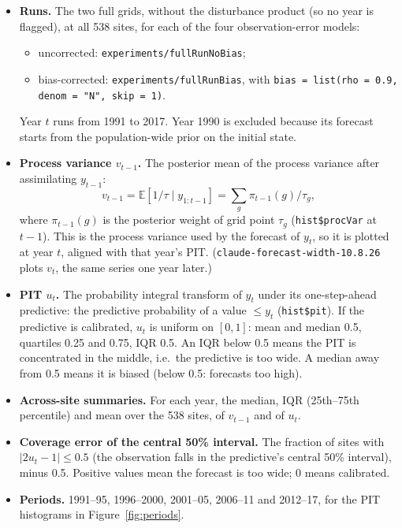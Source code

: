 \documentclass[11pt]{article}
\newcommand{\E}{\mathbb{E}}
\newcommand{\code}[1]{\texttt{#1}}
\begin{document}
\begin{itemize}
  \item \textbf{Runs.} The two full grids, without the disturbance product (so no year is
  flagged), at all 538 sites, for each of the four observation-error models:
  \begin{itemize}
    \item uncorrected: \code{experiments/fullRunNoBias};
    \item bias-corrected: \code{experiments/fullRunBias}, with
    \code{bias = list(rho = 0.9, denom = "N", skip = 1)}.
  \end{itemize}
  Year $t$ runs from 1991 to 2017. Year 1990 is excluded because its forecast starts
  from the population-wide prior on the initial state.
  \item \textbf{Process variance $v_{t-1}$.} The posterior mean of the process variance after assimilating
  $y_{t-1}$:
  \[
    v_{t-1} = \E[1/\tau \mid y_{1:t-1}] = \sum_g \pi_{t-1}(g)/\tau_g ,
  \]
  where $\pi_{t-1}(g)$ is the posterior weight of grid point $\tau_g$ (\code{hist\$procVar} at
  $t-1$). This is the process variance used by the forecast of $y_t$, so it is plotted at year
  $t$, aligned with that year's PIT. (\code{claude-forecast-width-10.8.26} plots $v_t$, the
  same series one year later.)
  \item \textbf{PIT $u_t$.} The probability integral transform of $y_t$ under its one-step-ahead
  predictive: the predictive probability of a value $\le y_t$ (\code{hist\$pit}). If
  the predictive is calibrated, $u_t$ is uniform on $[0,1]$: mean and median 0.5,
  quartiles 0.25 and 0.75, IQR 0.5. An IQR below 0.5 means the
  PIT is concentrated in the middle, i.e.\ the predictive is too wide. A median away from 0.5
  means it is biased (below 0.5: forecasts too high).
  \item \textbf{Across-site summaries.} For each year, the median, IQR (25th--75th
  percentile) and mean over the 538 sites, of $v_{t-1}$ and of $u_t$.
  \item \textbf{Coverage error of the central 50\% interval.} The fraction of sites with
  $|2u_t - 1| \le 0.5$ (the observation falls in the predictive's central 50\% interval),
  minus 0.5. Positive values mean the forecast is too wide; 0 means calibrated.
  \item \textbf{Periods.} 1991--95, 1996--2000, 2001--05, 2006--11 and 2012--17, for the PIT
  histograms in Figure~\ref{fig:periods}.
\end{itemize}
\end{document}
